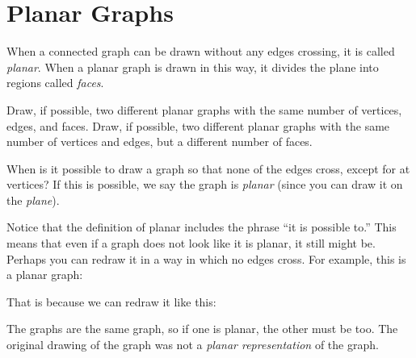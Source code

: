 \documentclass[12pt]{article}
\begin{document}
\section{Planar Graphs}


\begin{activity}
When a connected graph can be drawn without any edges crossing, it is called {\em planar}.  When a planar graph is drawn in this way, it divides the plane into regions called {\em faces}.
\begin{questions}
\question Draw, if possible, two different planar graphs with the same number of vertices, edges, and faces.
\question Draw, if possible, two different planar graphs with the same number of vertices and edges, but a different number of faces.
\end{questions}
\end{activity}

When is it possible to draw a graph so that none of the edges cross, except for at vertices? If this is possible, we say the graph is {\em planar} (since you can draw it on the {\em plane}).  

Notice that the definition of planar includes the phrase ``it is possible to.''  This means that even if a graph does not look like it is planar, it still might be.  Perhaps you can redraw it in a way in which no edges cross.  For example, this is a planar graph:

\begin{center}

\end{center}

That is because we can redraw it like this:

\begin{center}
\end{center}

The graphs are the same graph, so if one is planar, the other must be too.  The original drawing of the graph was not a {\em planar representation} of the graph.
\end{document}
